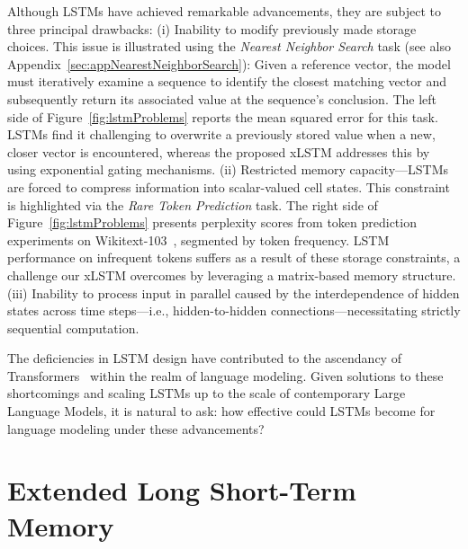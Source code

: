 Although LSTMs have achieved remarkable advancements, they are subject to three principal drawbacks: (i) Inability to modify previously made storage choices. This issue is illustrated using the {\it Nearest Neighbor Search} task (see also Appendix~\ref{sec:appNearestNeighborSearch}): Given a reference vector, the model must iteratively examine a sequence to identify the closest matching vector and subsequently return its associated value at the sequence’s conclusion. The left side of Figure~\ref{fig:lstmProblems} reports the mean squared error for this task. LSTMs find it challenging to overwrite a previously stored value when a new, closer vector is encountered, whereas the proposed xLSTM addresses this by using exponential gating mechanisms. (ii) Restricted memory capacity—LSTMs are forced to compress information into scalar-valued cell states. This constraint is highlighted via the {\it Rare Token Prediction} task. The right side of Figure~\ref{fig:lstmProblems} presents perplexity scores from token prediction experiments on Wikitext-103~\citep{Merity:17}, segmented by token frequency. LSTM performance on infrequent tokens suffers as a result of these storage constraints, a challenge our xLSTM overcomes by leveraging a matrix-based memory structure. (iii) Inability to process input in parallel caused by the interdependence of hidden states across time steps—i.e., hidden-to-hidden connections—necessitating strictly sequential computation. 

The deficiencies in LSTM design have contributed to the ascendancy of Transformers~\citep{Vaswani:17} within the realm of language modeling. Given solutions to these shortcomings and scaling LSTMs up to the scale of contemporary Large Language Models, it is natural to ask: how effective could LSTMs become for language modeling under these advancements?

\section{Extended Long Short-Term Memory}
\label{sec:xLSTM}


